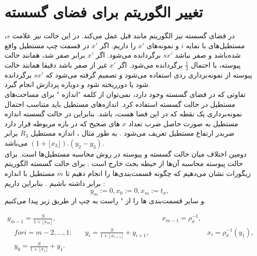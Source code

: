 \section{تغییر الگوریتم برای فضای گسسته}
در فضای گسسته نیز الگوریتم مانند قبل عمل می‌کند.  در این حالت نیز علامت $s$، مستطیل‌های با نمایه $i$ و نمونه‌های $x'$ را داریم. اگر $ x'$  در قسمت چپ مستطیل واقع شده‌باشد و صفر نباشد $sx'$ برگردانده می‌شود.  اگر $x'$ برابر صفر شد،  همانند حالت پیوسته، با احتمال $\frac{1}{2}$ برگردانده می‌شود. اگر $x'$ غیر از صفر باشد  دقیقا همانند حالت پیوسته از نمونه‌برداری ردی استفاده می‌شود و تصمیم گرفته می‌شود که $sx'$ برگردانده شود یا دورریخته شود و دوباره پردازش انجام گیرد.
\\ 
تفاوتی که در فضای گسسته وجود دارد، نمی‌توان از کلمه "اندازه "  برای مساحت‌های مستطیل در حالت گسسته استفاده کرد. اندازه‌های مستطیل باید متناسب احتمال نمونه‌برداری یک نقطه که در این فضا هست، باشد.  بنابراین در حالت گسسته اندازه مستطیل به صورت حاصل ضرب تعداد $x$ های صحیح که در بازه مربوطه قرار دارد ضربدر ارتفاع مستطیل تعریف می‌شود . به طور مثال ،  اندازه مستطیل $R_{3}$  برابر $(1 + \lfloor x_{3}\rfloor ).(y_{2} - y_{3}) $ می‌باشد.
\\
دومین اختلاف میان حالت گسسته و پیوسته در روش محاسبه مستطیل‌ها است.  برای حالت پیوسته محاسبه آن‌ها از حیطه بحث خارج است . برای حالت گسسته الگوریتم زیگورات نشان می‌دهیم که چگونه قسمت‌بندی‌ها را انجام دهیم تا $m$ مستطیل با اندازه برابر داشته باشیم . بنابراین داریم :
\begin{equation}
y_{m} := 0, 		x_{0} := 0,		x_{m} := t_{\sigma},
\end{equation} 
 و سایر قسمت‌بندی ها را از " راست به چپ از طریق زیر پیدا می‌کنیم.
    
     \begin{align*}
     y_{m-1} = \frac{S}{1+\lfloor x_{m}\rfloor}, &\quad &\quad x_{m-1}=\rho ^{-1}_{\sigma},\\
     \quad
     for i = m-2,...,1:	 &\quad y_{i}=\frac{S}{1+\lfloor x_{i+1}\rfloor}+y_{i+1}, &\quad & x_{i} = \rho ^{-1}_{\sigma}(y_{1}),
     \\ \quad
     y_{0}= \frac{S}{1+\lfloor x_{1}\rfloor} + y_{1}.
          \end{align*}
   

      
